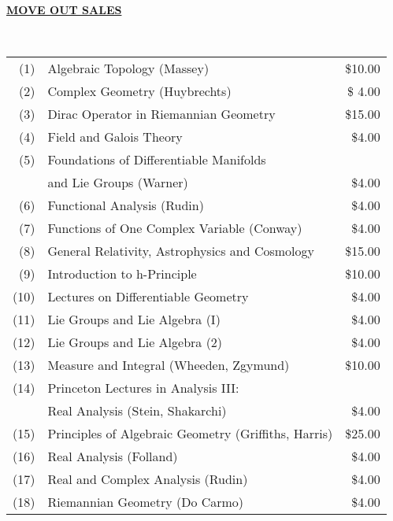 \documentclass{article}[12pt]
\begin{document}
\newcommand{\spa}{\mbox{ }}
\begin{center} {\large \bf \underline{MOVE OUT SALES}} \end{center}
\spa\\[-0.1in]
\begin{tabular}{rlr}
(1) & Algebraic Topology (Massey)& \$10.00	\\[0.05in]
(2) & Complex Geometry (Huybrechts)& \$ 4.00 \\[0.05in]
(3) & Dirac Operator in Riemannian Geometry & \$15.00 \\[0.05in]
(4) & Field and Galois Theory & \$4.00 \\[0.05in]
(5) & Foundations of Differentiable Manifolds & \\
& and Lie Groups (Warner) & \$4.00 \\[0.05in]
(6) & Functional Analysis (Rudin)& \$4.00 \\[0.05in]
(7) & Functions of One Complex Variable (Conway)& \$4.00 \\[0.05in]
(8) & General Relativity, Astrophysics and Cosmology & \$15.00 \\[0.05in]
(9) & Introduction to h-Principle & \$10.00 \\[0.05in]
(10) & Lectures on Differentiable Geometry & \$4.00 \\[0.05in]
(11) & Lie Groups and Lie Algebra (I) & \$4.00 \\[0.05in]
(12) & Lie Groups and Lie Algebra (2) & \$4.00 \\[0.05in]
(13) & Measure and Integral (Wheeden, Zgymund) & \$10.00 \\[0.05in]
(14) & Princeton Lectures in Analysis III:&\\
& Real Analysis (Stein, Shakarchi)& \$4.00 \\[0.05in]
(15) & Principles of Algebraic Geometry (Griffiths, Harris)& \$25.00 \\[0.05in] 
(16) & Real Analysis (Folland) & \$4.00 \\[0.05in]
(17) & Real and Complex Analysis (Rudin) & \$4.00 \\[0.05in]
(18) & Riemannian Geometry (Do Carmo) & \$4.00
\end{tabular} \\
\newpage
\end{document}
